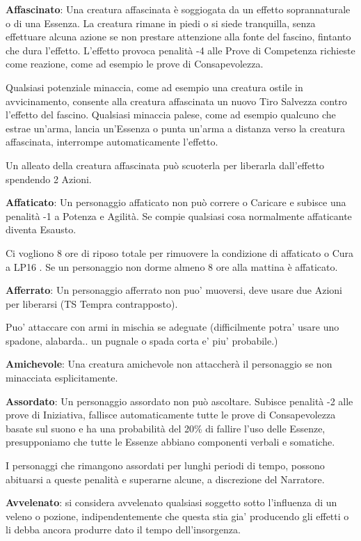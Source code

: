 \documentclass[a4paper,11pt,twoside,openany]{book}
\begin{document}
\textbf{Affascinato}: Una creatura affascinata è soggiogata da un effetto soprannaturale o di una Essenza. La creatura rimane in piedi o si siede tranquilla, senza effettuare alcuna azione se non prestare attenzione alla fonte del fascino, fintanto che dura l'effetto. L'effetto provoca penalità -4 alle Prove di Competenza richieste come reazione, come ad esempio le prove di Consapevolezza.

Qualsiasi potenziale minaccia, come ad esempio una creatura ostile in avvicinamento, consente alla creatura affascinata un nuovo Tiro Salvezza contro l'effetto del fascino. Qualsiasi minaccia palese, come ad esempio qualcuno che estrae un'arma, lancia un'Essenza o punta un'arma a distanza verso la creatura affascinata, interrompe automaticamente l'effetto.

Un alleato della creatura affascinata può scuoterla per liberarla dall'effetto spendendo 2 Azioni.

\textbf{Affaticato}: Un personaggio affaticato non può correre o Caricare e subisce una penalità -1 a Potenza e Agilità. Se compie qualsiasi cosa normalmente affaticante diventa Esausto.

Ci vogliono 8 ore di riposo totale per rimuovere la condizione di affaticato o Cura a LP16 . Se un personaggio non dorme almeno 8 ore alla mattina è affaticato.

\textbf{Afferrato}: Un personaggio afferrato non puo' muoversi, deve usare due Azioni per liberarsi (TS Tempra contrapposto).

Puo' attaccare con armi in mischia se adeguate (difficilmente potra' usare uno spadone, alabarda.. un pugnale o spada corta e' piu' probabile.)

\textbf{Amichevole}: Una creatura amichevole non attaccherà il personaggio se non minacciata esplicitamente.

\textbf{Assordato}: Un personaggio assordato non può ascoltare. Subisce penalità -2 alle prove di Iniziativa, fallisce automaticamente tutte le prove di Consapevolezza basate sul suono e ha una probabilità del 20\% di fallire l'uso delle Essenze, presupponiamo che tutte le Essenze abbiano componenti verbali e somatiche.

I personaggi che rimangono assordati per lunghi periodi di tempo, possono abituarsi a queste penalità e superarne alcune, a discrezione del Narratore.

\textbf{Avvelenato}: si considera avvelenato qualsiasi soggetto sotto l'influenza di un veleno o pozione, indipendentemente che questa stia gia' producendo gli effetti o li debba ancora produrre dato il tempo dell'insorgenza.
\end{document}
